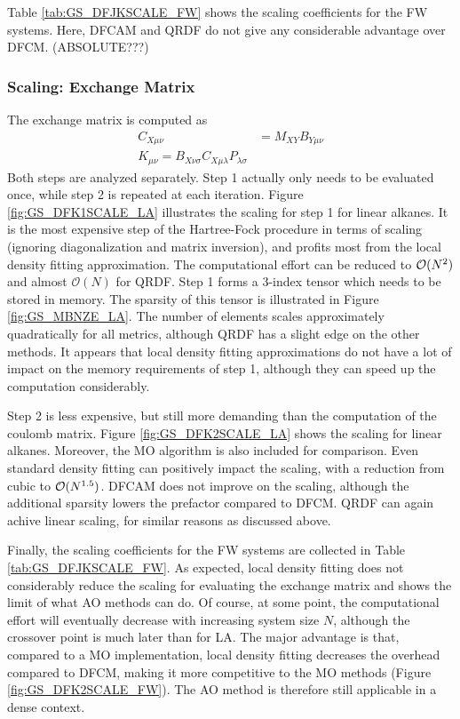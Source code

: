 Table \ref{tab:GS_DFJKSCALE_FW} shows the scaling coefficients for the FW systems. Here, DFCAM and QRDF do not give any considerable advantage over DFCM. (ABSOLUTE???)

\subsubsection{Scaling: Exchange Matrix}

The exchange matrix is computed as
\begin{align}
C_{X\mu\nu} &= M_{XY} B_{Y\mu\nu} \\
K_{\mu\nu} = B_{X\nu\sigma} C_{X\mu\lambda} P_{\lambda\sigma} 
\end{align}
\noindent Both steps are analyzed separately. Step 1 actually only needs to be evaluated once, while step 2 is repeated at each iteration. Figure \ref{fig:GS_DFK1SCALE_LA} illustrates the scaling for step 1 for linear alkanes. It is the most expensive step of the Hartree-Fock procedure in terms of scaling (ignoring diagonalization and matrix inversion), and profits most from the local density fitting approximation. The computational effort can be reduced to $\mathcal{O}(N^{2})$ and almost $\mathcal{O}(N)$ for QRDF. Step 1 forms a 3-index tensor which needs to be stored in memory. The sparsity of this tensor is illustrated in Figure \ref{fig:GS_MBNZE_LA}. The number of elements scales approximately quadratically for all metrics, although QRDF has a slight edge on the other methods. It appears that local density fitting approximations do not have a lot of impact on the memory requirements of step 1, although they can speed up the computation considerably. 

Step 2 is less expensive, but still more demanding than the computation of the coulomb matrix. Figure \ref{fig:GS_DFK2SCALE_LA} shows the scaling for linear alkanes. Moreover, the MO algorithm is also included for comparison. Even standard density fitting can positively impact the scaling, with a reduction from cubic to $\mathcal{O}(N^{1.5})$. DFCAM does not improve on the scaling, although the additional sparsity lowers the prefactor compared to DFCM. QRDF can again achive linear scaling, for similar reasons as discussed above. 

Finally, the scaling coefficients for the FW systems are collected in Table \ref{tab:GS_DFJKSCALE_FW}. As expected, local density fitting does not considerably reduce the scaling for evaluating the exchange matrix and shows the limit of what AO methods can do. Of course, at some point, the computational effort will eventually decrease with increasing system size $N$, although the crossover point is much later than for LA. The major advantage is that, compared to a MO implementation, local density fitting decreases the overhead compared to DFCM, making it more competitive to the MO methods (Figure \ref{fig:GS_DFK2SCALE_FW}). The AO method is therefore still applicable in a dense context. 

